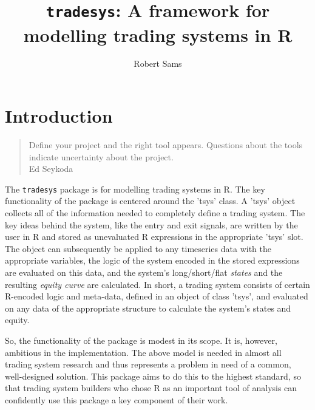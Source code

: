 \documentclass[a4]{article}
\newcommand{\code}[1]{\texttt{#1}}
\begin{document}
\author{Robert Sams}
\title{\code{tradesys}: A framework for modelling trading systems in R}
\maketitle



\section{Introduction} \label{sec:intro}
\begin{quote}
Define your project and the right tool appears. Questions about the
tools indicate uncertainty about the project. \\Ed Seykoda
\end{quote}

The \code{tradesys} package is for modelling trading systems in R. The
key functionality of the package is centered around the 'tsys'
class. A 'tsys' object collects all of the information needed to
completely define a trading system. The key ideas behind the system,
like the entry and exit signals, are written by the user in R and
stored as unevaluated R expressions in the appropriate 'tsys'
slot. The object can subsequently be applied to any timeseries data
with the appropriate variables, the logic of the system encoded in the
stored expressions are evaluated on this data, and the system's
long/short/flat \emph{states} and the resulting \emph{equity curve}
are calculated. In short, a trading system consists of certain
R-encoded logic and meta-data, defined in an object of class 'tsys',
and evaluated on any data of the appropriate structure to calculate
the system's states and equity.

So, the functionality of the package is modest in its scope. It is,
however, ambitious in the implementation. The above model is needed in
almost all trading system research and thus represents a problem in
need of a common, well-designed solution. This package aims to do this
to the highest standard, so that trading system builders who chose R
as an important tool of analysis can confidently use this package a
key component of their work.
\end{document}
